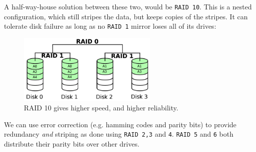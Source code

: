 A half-way-house solution between these two, would be \texttt{RAID 10}. This is
a nested configuration, which still stripes the data, but keeps copies of the
stripes. It can tolerate disk failure as long as no \texttt{RAID 1} mirror loses
all of its drives:

\begin{figure}[H]
  \centering
  \includegraphics[width=0.6\textwidth]{images/raid10}
  \caption{RAID 10 gives higher speed, and higher reliability.}
  \label{raid10}
\end{figure}  


We can use error correction (e.g. hamming codes and parity bits) to provide
redundancy \textit{and} striping as done using \texttt{RAID 2,3} and \texttt{4}.
\texttt{RAID 5} and \texttt{6} both distribute their parity bits over other
drives.

